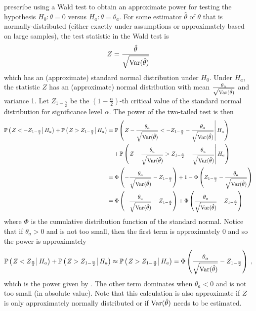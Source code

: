 \documentclass[10pt]{article}
\begin{document}
\textcite{Hussey:2007} prescribe using a Wald test to obtain an approximate power for testing the hypothesis $H_0:\theta=0$ versus $H_a:\theta=\theta_a$. For some estimator $\hat{\theta}$ of $\theta$ that is normally-distributed (either exactly under assumptions or approximately based on large samples), the test statistic in the Wald test is
\[
Z = \frac{\hat{\theta}}{\sqrt{\mathrm{Var}(\hat{\theta})}}
\]
which has an (approximate) standard normal distribution under $H_0$. Under $H_a$, the statistic $Z$ has an (approximate) normal distribution with mean $\frac{\theta_a}{\sqrt{\mathrm{Var}(\hat{\theta})}}$ and variance 1. Let $Z_{1-\frac{\alpha}{2}}$ be the $\left(1-\frac{\alpha}{2}\right)$-th critical value of the standard normal distribution for significance level $\alpha$. The power of the two-tailed test is then
\begin{align*}
\mathbb{P}\left(\left.Z<-Z_{1-\frac{\alpha}{2}}\right|H_a\right) + \mathbb{P}\left(\left.Z>Z_{1-\frac{\alpha}{2}}\right|H_a\right) &= \mathbb{P}\left(\left.Z-\frac{\theta_a}{\sqrt{\mathrm{Var}(\hat{\theta})}}<-Z_{1-\frac{\alpha}{2}}-\frac{\theta_a}{\sqrt{\mathrm{Var}(\hat{\theta})}}\right|H_a\right) \\
&\quad + \mathbb{P}\left(\left.Z-\frac{\theta_a}{\sqrt{\mathrm{Var}(\hat{\theta})}}>Z_{1-\frac{\alpha}{2}}-\frac{\theta_a}{\sqrt{\mathrm{Var}(\hat{\theta})}}\right|H_a\right) \\
&= \Phi\left(-\frac{\theta_a}{\sqrt{\mathrm{Var}(\hat{\theta})}}-Z_{1-\frac{\alpha}{2}}\right) + 1-\Phi\left(Z_{1-\frac{\alpha}{2}}-\frac{\theta_a}{\sqrt{\mathrm{Var}(\hat{\theta})}}\right) \\
&= \Phi\left(-\frac{\theta_a}{\sqrt{\mathrm{Var}(\hat{\theta})}}-Z_{1-\frac{\alpha}{2}}\right) + \Phi\left(\frac{\theta_a}{\sqrt{\mathrm{Var}(\hat{\theta})}} - Z_{1-\frac{\alpha}{2}}\right)
\end{align*}
where $\Phi$ is the cumulative distribution function of the standard normal. Notice that if $\theta_a>0$ and is not too small, then the first term is approximately 0 and so the power is approximately 
\[
\mathbb{P}\left(\left.Z<Z_{\frac{\alpha}{2}}\right|H_a\right) + \mathbb{P}\left(\left.Z>Z_{1-\frac{\alpha}{2}}\right|H_a\right) \approx \mathbb{P}\left(\left.Z>Z_{1-\frac{\alpha}{2}}\right|H_a\right) = \Phi\left(\frac{\theta_a}{\sqrt{\mathrm{Var}(\hat{\theta})}} - Z_{1-\frac{\alpha}{2}}\right) \;,
\]
which is the power given by \textcite{Hussey:2007}. The other term dominates when $\theta_a<0$ and is not too small (in absolute value). Note that this calculation is also approximate if $Z$ is only approximately normally distributed or if $\mathrm{Var}(\hat{\theta})$ needs to be estimated.
\end{document}
